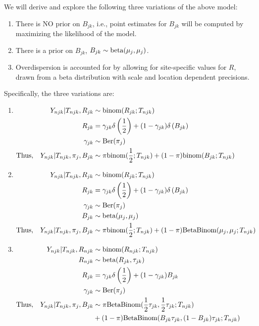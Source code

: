 \documentclass[reqno]{amsart}
\numberwithin{equation}{section}
\begin{document}
We will derive and explore the following three variations of the above model:
\begin{enumerate}
    \item There is NO prior on $B_{jk}$, i.e., point estimates for $B_{jk}$ will be computed by maximizing the likelihood of the model.
    \item There is a prior on $B_{jk}$, $B_{jk} \sim \mathrm{beta}(\mu_j, \mu_j)$.
    \item Overdispersion is accounted for by allowing for site-specific values for $R$, drawn from a beta
    distribution with scale and location dependent precisions.
\end{enumerate}
Specifically, the three variations are:
\begin{enumerate}
    \item $\begin{aligned}[t]
        Y_{njk} | T_{njk}, R_{jk} &\sim \mathrm{binom}(R_{jk}; T_{njk}) \\
        R_{jk} &= \gamma_{jk} \delta \left(\frac{1}{2} \right) + (1 - \gamma_{jk}) \delta \left(B_{jk} \right) \\
        \gamma_{jk} &\sim \mathrm{Ber}(\pi_j) \\
        \mathrm{Thus,} \quad Y_{njk} | T_{njk}, \pi_j, B_{jk} &\sim \pi \mathrm{binom}(\frac{1}{2}; T_{njk}) + (1-\pi) \mathrm{binom}(B_{jk}; T_{njk})
    \end{aligned}$
    \item $\begin{aligned}[t]
        Y_{njk} | T_{njk}, R_{jk} &\sim \mathrm{binom}(R_{jk}; T_{njk}) \\
        R_{jk} &= \gamma_{jk} \delta \left(\frac{1}{2} \right) + (1 - \gamma_{jk}) \delta \left(B_{jk} \right) \\
        \gamma_{jk} &\sim \mathrm{Ber}(\pi_j) \\
        B_{jk} &\sim \mathrm{beta}(\mu_j, \mu_j) \\
        \mathrm{Thus,} \quad Y_{njk} | T_{njk}, \pi_j, B_{jk} &\sim \pi \mathrm{binom}(\frac{1}{2}; T_{njk}) + (1-\pi) \mathrm{BetaBinom}(\mu_j, \mu_j; T_{njk})
    \end{aligned}$
    \item $\begin{aligned}[t]
        Y_{njk} | T_{njk}, R_{njk} &\sim \mathrm{binom}(R_{njk}; T_{njk}) \\
        R_{njk} &\sim \mathrm{beta}(R_{jk}, \tau_{jk}) \\
        R_{jk} &= \gamma_{jk} \delta \left(\frac{1}{2} \right) + (1 - \gamma_{jk}) B_{jk} \\
        \gamma_{jk} &\sim \mathrm{Ber}(\pi_j) \\
        \mathrm{Thus,} \quad Y_{njk} | T_{njk}, \pi_j, B_{jk} &\sim \pi \mathrm{BetaBinom}(\frac{1}{2} \tau_{jk}, \frac{1}{2} \tau_{jk}; T_{njk}) \\
            &+ (1-\pi) \mathrm{BetaBinom}(B_{jk}\tau_{jk}, (1-B_{jk})\tau_{jk}; T_{njk})
    \end{aligned}$
\end{enumerate}
\end{document}
